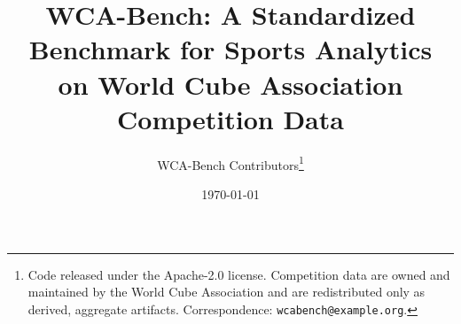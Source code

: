 \documentclass[11pt]{article}
\title{\textbf{WCA-Bench: A Standardized Benchmark for Sports Analytics\\ on World Cube Association Competition Data}}
\author{
  WCA-Bench Contributors\thanks{%
    Code released under the Apache-2.0 license. Competition data are owned and
    maintained by the World Cube Association and are redistributed only as
    derived, aggregate artifacts. Correspondence: \texttt{wcabench@example.org}.}
}
\date{\today}
\begin{document}
\maketitle

\begin{abstract}

\end{abstract}















\appendix

\end{document}

